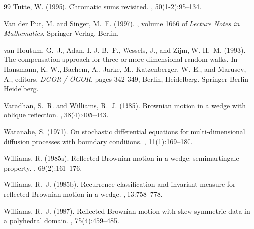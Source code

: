 \documentclass[11pt]{article}
\theoremstyle{definition}
\begin{document}
\begin{thebibliography}{99}
Tutte, W. (1995).
\newblock Chromatic sums revisited.
, 50(1-2):95--134.

{Van der Put}, M. and Singer, M.~F. (1997).
, volume 1666 of {\em
  Lecture Notes in Mathematics}.
\newblock Springer-Verlag, Berlin.

van Houtum, G.~J., Adan, I. J. B.~F., Wessels, J., and Zijm, W. H.~M. (1993).
\newblock The compensation approach for three or more dimensional random walks.
\newblock In Hansmann, K.-W., Bachem, A., Jarke, M., Katzenberger, W.~E., and
  Marusev, A., editors, {\em DGOR / {\"O}GOR}, pages 342--349, Berlin,
  Heidelberg. Springer Berlin Heidelberg.

Varadhan, S.~R. and Williams, R.~J. (1985).
\newblock Brownian motion in a wedge with oblique reflection.
, 38(4):405--443.



Watanabe, S. (1971).
\newblock On stochastic differential equations for multi-dimensional diffusion
  processes with boundary conditions.
, 11(1):169--180.

Williams, R. (1985a).
\newblock Reflected {B}rownian motion in a wedge: semimartingale property.
, 69(2):161--176.

Williams, R.~J. (1985b).
\newblock Recurrence classification and invariant measure for reflected
  {Brownian} motion in a wedge.
, 13:758--778.

Williams, R.~J. (1987).
\newblock Reflected Brownian motion with skew symmetric data in a polyhedral
  domain.
, 75(4):459--485.


\end{thebibliography}
\end{document}
